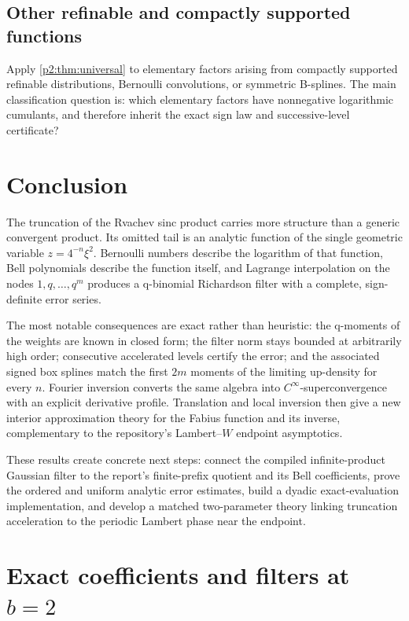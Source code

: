 \documentclass[11pt,oneside]{article}
\numberwithin{equation}{section}
\theoremstyle{definition}
\theoremstyle{remark}
\begin{document}
\subsection{Other refinable and compactly supported functions}

Apply \cref{p2:thm:universal} to elementary factors arising from compactly
supported refinable distributions, Bernoulli convolutions, or symmetric
B-splines. The main classification question is: which elementary factors have
nonnegative logarithmic cumulants, and therefore inherit the exact sign law and
successive-level certificate?

\section{Conclusion}

The truncation of the Rvachev sinc product carries more structure than a generic
convergent product. Its omitted tail is an analytic function of the single
geometric variable \(z=4^{-n}\xi^2\). Bernoulli numbers describe the logarithm
of that function, Bell polynomials describe the function itself, and Lagrange
interpolation on the nodes \(1,q,\ldots,q^m\) produces a q-binomial Richardson
filter with a complete, sign-definite error series.

The most notable consequences are exact rather than heuristic: the q-moments of
the weights are known in closed form; the filter norm stays bounded at arbitrarily
high order; consecutive accelerated levels certify the error; and the associated
signed box splines match the first \(2m\) moments of the limiting up-density for
every \(n\). Fourier inversion converts the same algebra into
\(C^\infty\)-superconvergence with an explicit derivative profile. Translation
and local inversion then give a new interior approximation theory for the Fabius
function and its inverse, complementary to the repository's Lambert--\(W\)
endpoint asymptotics.

These results create concrete next steps: connect the compiled infinite-product
Gaussian filter to the report's finite-prefix quotient and its Bell
coefficients, prove the ordered and uniform analytic error estimates, build a
dyadic exact-evaluation implementation, and develop a matched
two-parameter theory linking truncation acceleration to the periodic Lambert
phase near the endpoint.

\appendix

\section{Exact coefficients and filters at \texorpdfstring{\(b=2\)}{b=2}}
\label{p2:app:coeff}
\end{document}
